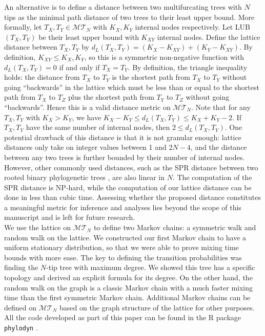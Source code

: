 \documentclass{article}
\begin{document}
An alternative is to define a distance between two multifurcating trees with $N$ tips as the minimal path distance of two trees to their least upper bound. More formally, let $T_X, T_Y \in \mathcal{MT}_N$  with $K_X, K_Y$ internal nodes respectively. Let LUB$(T_X,T_Y)$ be their least upper bound with $K_{XY}$ internal nodes. Define the lattice distance between $T_X, T_Y$ by $d_L(T_X, T_Y) = (K_X-K_{XY}) + (K_Y-K_{XY})$. By definition, $K_{XY} \leq K_X, K_Y$, so this is a symmetric non-negative function with $d_L(T_X, T_Y)=0$ if and only if $T_X=T_Y$. By definition, the triangle inequality holds: the distance from $T_X$ to $T_Y$ is the shortest path from $T_X$ to $T_Y$ without going ``backwards'' in the lattice which must be less than or equal to the shortest path from $T_X$ to $T_Z$ plus the shortest path from $T_Y$ to $T_Z$ without going ``backwards''. Hence this is a valid distance metric on $\mathcal{MT}_N$. Note that for any $T_X, T_Y$ with $K_X>K_Y$, we have $K_X-K_Y \leq d_L(T_X, T_Y) \leq K_X+K_Y-2$. If $T_X, T_Y$ have the same number of internal nodes, then $2 \leq d_L(T_X, T_Y)$. One potential drawback of this distance is that it is not granular enough: lattice distances only take on integer values between 1 and $2N-4$, and the distance between any two trees is further bounded by their number of internal nodes. However, other commonly used distances, such as the SPR distance between two rooted binary phylogenetic trees \citep{bordewich2005computational}, are also linear in $N$. The computation of the SPR distance is NP-hard, while the computation of our lattice distance can be done in less than cubic time. Assessing whether the proposed distance constitutes a meaningful metric for inference and analyses lies beyond the scope of this manuscript and is left for future research. \\ 

We use the lattice on $\mathcal{MT}_N$ to define two Markov chains: a symmetric walk and random walk on the lattice. We constructed our first Markov chain to have a uniform stationary distribution, so that we were able to prove mixing time bounds with more ease. The key to defining the transition probabilities was finding the $N$-tip tree with maximum degree. We showed this tree has a specific topology and derived an explicit formula for its degree. On the other hand, the random walk on the graph is a classic Markov chain with a much faster mixing time than the first symmetric Markov chain. Additional Markov chains can be defined on $\mathcal{MT}_N$ based on the graph structure of the lattice for other purposes. All the code developed as part of this paper can be found in the R package \texttt{phylodyn} \citep{karcher2017phylodyn}. \\ 
\end{document}
